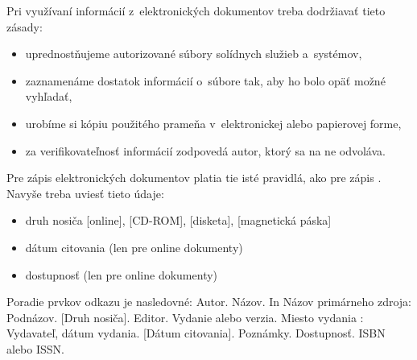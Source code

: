 Pri využívaní informácií z~elektronických dokumentov  treba
dodržiavať\/ tieto zásady:
\begin{itemize}
\item  uprednostňujeme autorizované súbory solídnych služieb
a~systémov,
\item zaznamenáme dostatok informácií o~súbore tak, aby ho bolo opäť\/
možné vyhľadať\/,
\item urobíme si kópiu použitého prameňa v~elektronickej alebo
papierovej forme,
\item za verifikovateľnosť\/ informácií zodpovedá autor, ktorý sa na
ne odvoláva.
\end{itemize}

Pre zápis elektronických dokumentov platia tie isté pravidlá, ako pre
zápis . Navyše treba uviesť\/ tieto údaje:
\begin{itemize}
\item  druh nosiča  [online], [CD-ROM], [disketa], [magnetická páska]
\item dátum citovania  (len pre online dokumenty)
\item dostupnosť\/  (len pre online dokumenty)
\end{itemize}

Poradie prvkov odkazu je nasledovné:
Autor. Názov. In Názov primárneho zdroja: Podnázov. [Druh  nosiča].
Editor. Vydanie alebo verzia. Miesto vydania : Vydavateľ, dátum
vydania. [Dátum citovania]. Poznámky.  Dostupnosť\/. ISBN alebo ISSN.